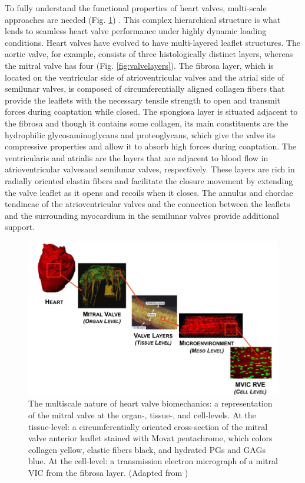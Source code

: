     To fully understand the functional properties of heart valves, multi-scale approaches are needed (Fig. \ref{fig:multiscalevalve}) \cite{salma_heart_2016}. This complex hierarchical structure is what lends to seamless heart valve performance under highly dynamic loading conditions. Heart valves have evolved to have multi-layered leaflet structures. The aortic valve, for example, consists of three histologically distinct layers, whereas the mitral valve has four (Fig. \ref{fig:valvelayers}). The fibrosa layer, which is located on the ventricular side of atrioventricular valves and the atrial side of semilunar valves, is composed of circumferentially aligned collagen fibers that provide the leaflets with the necessary tensile strength to open and transmit forces during coaptation while closed. The spongiosa layer is situated adjacent to the fibrosa and though it contains some collagen, its main constituents are the hydrophilic glycosaminoglycans and proteoglycans, which give the valve its compressive properties and allow it to absorb high forces during coaptation. The ventricularis and atrialis are the layers that are adjacent to blood flow in atrioventricular valvesand semilunar valves, respectively. These layers are rich in radially oriented elastin fibers and facilitate the closure movement by extending the valve leaflet as it opens and recoils when it closes. The annulus and chordae tendineae of the atrioventricular valves and the connection between the leaflets and the surrounding myocardium in the semilunar valves provide additional support. 
    


\begin{figure}
\centering
\includegraphics[width=\textwidth]{Images/chapter1/multiscalevalve.png}
\caption{The multiscale nature of heart valve biomechanics: a representation of the mitral valve at the organ-, tissue-, and cell-levels. At the tissue-level: a circumferentially oriented cross-section of the mitral valve anterior leaflet stained with Movat pentachrome, which colors collagen yellow, elastic fibers black, and hydrated PGs and GAGs blue. At the cell-level: a transmission electron micrograph of a mitral VIC from the fibrosa layer. (Adapted from \cite{salma_heart_2016})}
\label{fig:multiscalevalve}
\end{figure}


